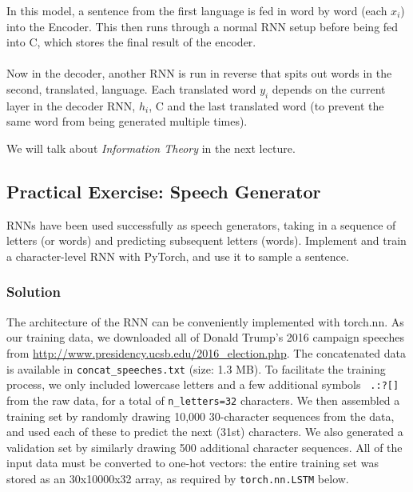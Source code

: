 \documentclass{article}
\begin{document}
In this model, a sentence from the first language is fed in word by word (each $x_i$) into the Encoder. This then runs through a normal RNN setup before being fed into C, which stores the final result of the encoder. 
\\ \\ \noindent 
Now in the decoder, another RNN is run in reverse that spits out words in the second, translated, language. Each translated word  $y_i$ depends on the current layer in the decoder RNN, $h_i$, C and the last translated word (to prevent the same word from being generated multiple times). 
\begin{remark}
We will talk about \emph{Information Theory} in the next lecture.

\subsection{Practical Exercise: Speech Generator}

RNNs have been used successfully as speech generators, taking in a sequence of letters (or words) and predicting subsequent letters (words). Implement and train a character-level RNN with PyTorch, and use it to sample a sentence.

\subsubsection{Solution}

The architecture of the RNN can be conveniently implemented with torch.nn. As our training data, we downloaded all of Donald Trump's 2016 campaign speeches from \url{http://www.presidency.ucsb.edu/2016_election.php}. The concatenated data is available in \verb|concat_speeches.txt| (size: 1.3 MB). To facilitate the training process, we only included lowercase letters and a few additional symbols \verb| .:?[]| from the raw data, for a total of \verb|n_letters=32| characters. We then assembled a training set by randomly drawing 10,000 30-character sequences from the data, and used each of these to predict the next (31st) characters. We also generated a validation set by similarly drawing 500 additional character sequences. All of the input data must be converted to one-hot vectors: the entire training set was stored as an 30x10000x32 array, as required by \verb|torch.nn.LSTM| below.


\end{remark}
\end{document}
